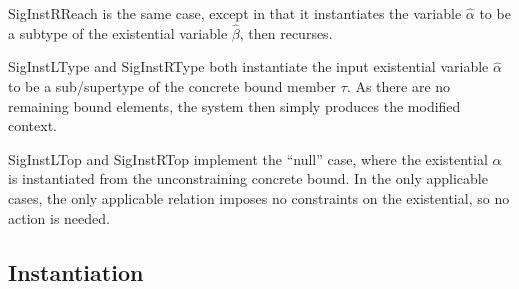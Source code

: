 \documentclass{sig-alternate}
\begin{document}
SigInstRReach is the same case, except in that it instantiates the variable $\hat{\alpha}$ to be a subtype of the existential variable $\hat{\beta}$, then recurses.

SigInstLType and SigInstRType both instantiate the input existential variable $\hat{\alpha}$ to be a sub/supertype of the concrete bound member $\tau$. As there are no remaining bound elements, the system then simply produces the modified context.

SigInstLTop and SigInstRTop implement the ``null'' case, where the existential $\hat{\alpha}$ is instantiated from the unconstraining concrete bound. In the only applicable cases, the only applicable relation imposes no constraints on the existential, so no action is needed.

\subsection{Instantiation}
\end{document}
